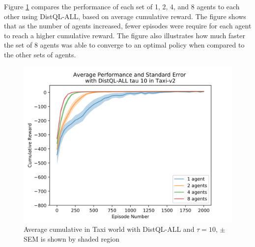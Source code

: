 \documentclass[jair,twoside,11pt,theapa]{article}
\begin{document}
Figure \ref{fig:DistQL-ALL-tau-10-env-Taxi} compares the performance of each set of 1, 2, 4, and 8 agents to each other using DistQL-ALL, based on average cumulative reward. The figure shows that as the number of agents increased, fewer episodes were require for each agent to reach a higher cumulative reward. 
The figure also illustrates how much faster the set of 8 agents was able to converge to an optimal policy when compared to the other sets of agents.

\begin{figure}[h]
\centering
\begin{minipage}{.4\textwidth}
	\centering
	\includegraphics[width=1\linewidth]{resultImages/binned-Average-Performance-and-Standard-Error-with-DistQL-ALL-tau-10-in-Taxi-v2}
	\caption{Average cumulative in Taxi world with DistQL-ALL and $\tau=10$, $\pm$ SEM is shown by shaded region}
	\label{fig:DistQL-ALL-tau-10-env-Taxi}
\end{minipage}
\begin{minipage}{.4\textwidth}
	\centering

\end{minipage}
\end{figure}
\end{document}
